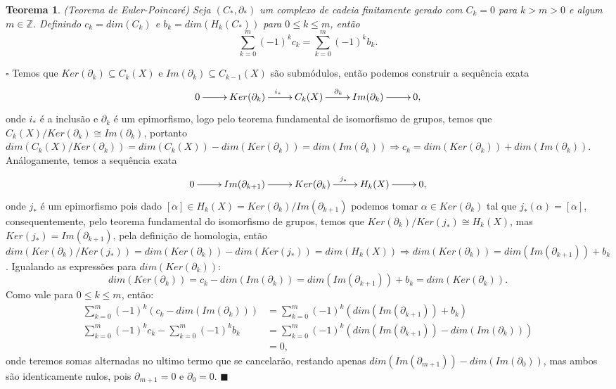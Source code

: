 \documentclass[12pt]{book}
\newtheorem{teorema}{Teorema}[section]
\newenvironment{prova}[1]{$\square$ #1}{\hfill$\blacksquare$}
\newcommand{\classe}[1]{[#1]}
\newcommand{\homologia}[2]{H_{#1}(#2)}
\begin{document}
	\begin{teorema}
		(Teorema de Euler-Poincaré) Seja $(C_{*}, \partial_{*})$ um complexo de cadeia finitamente gerado com $C_{k} = 0$ para $k>m>0$ e algum $m \in \mathbb{Z}$. Definindo $c_{k} = dim(C_{k})$ e $b_{k} = dim(\homologia{k}{C_{*}})$ para $0 \leq k \leq m$, então
		$$
		\sum_{k=0}^{m}(-1)^{k}c_{k} = \sum_{k=0}^{m}(-1)^{k}b_{k}.
		$$
	\end{teorema}
	\begin{prova}
		Temos que $Ker(\partial_{k}) \subseteq C_{k}(X)$ e $Im(\partial_{k}) \subseteq C_{k-1}(X)$ são submódulos, então podemos construir a sequência exata
		$$
		\xymatrix{
			0 \ar[r] & Ker(\partial_{k}) \ar[r]^{i_{*}} &  C_{k}(X)  \ar[r]^{\partial_{k}} & Im(\partial_{k}) \ar[r] & 0,
		}
		$$
		onde $i_{*}$ é a inclusão e $\partial_{k}$ é um epimorfismo, logo pelo teorema fundamental de isomorfismo de grupos, temos que $ C_{k}(X)/Ker(\partial_{k}) \cong Im(\partial_{k})$, portanto $dim(C_{k}(X)/Ker(\partial_{k})) = dim(C_{k}(X)) - dim(Ker(\partial_{k})) = dim(Im(\partial_{k})) \Rightarrow c_{k} = dim(Ker(\partial_{k})) + dim(Im(\partial_{k}))$. Análogamente, temos a sequência exata
		$$
		\xymatrix{
			0 \ar[r] & Im(\partial_{k+1}) \ar[r] &  Ker(\partial_{k})  \ar[r]^{j_{*}} & \homologia{k}{X}\ar[r] & 0,
		}
		$$
		onde $j_{*}$ é um epimorfismo pois dado $\classe{\alpha} \in \homologia{k}{X} = Ker(\partial_{k})/Im(\partial_{k+1})$ podemos tomar $\alpha \in Ker(\partial_{k})$ tal que $j_{*}(\alpha) = \classe{\alpha}$, consequentemente, pelo teorema fundamental do isomorfismo de grupos, temos que $Ker(\partial_{k})/Ker(j_{*}) \cong \homologia{k}{X}$, mas $Ker(j_{*}) = Im(\partial_{k+1})$, pela definição de homologia, então $dim(Ker(\partial_{k})/Ker(j_{*})) = dim(Ker(\partial_{k})) - dim(Ker(j_{*})) = dim(\homologia{k}{X}) \Rightarrow dim(Ker(\partial_{k})) = dim(Im(\partial_{k+1}))+ b_{k}$. Igualando as expressões para $dim(Ker(\partial_{k}))$:
		$$
		dim(Ker(\partial_{k})) = c_{k} - dim(Im(\partial_{k})) = dim(Im(\partial_{k+1}))+ b_{k} = dim(Ker(\partial_{k})).
		$$
		Como vale para $0 \leq k \leq m$, então:
		$$
		\begin{aligned}
		\sum_{k=0}^{m}	(-1)^{k}(c_{k} - dim(Im(\partial_{k}))) &= \sum_{k=0}^{m}	(-1)^{k}( dim(Im(\partial_{k+1}))+ b_{k})
		\\
		\sum_{k=0}^{m}	(-1)^{k}c_{k} - \sum_{k=0}^{m}(-1)^{k} b_{k} &= \sum_{k=0}^{m}	(-1)^{k} (dim(Im(\partial_{k+1})) -  dim(Im(\partial_{k})))
		\\
		&= 0,
		\end{aligned}
		$$
		onde teremos somas alternadas no ultimo termo que se cancelarão, restando apenas $dim(Im(\partial_{m+1})) - dim(Im(\partial_{0}))$, mas ambos são identicamente nulos, pois $\partial_{m+1} = 0$ e $\partial_{0} = 0$.
	\end{prova}
	
\end{document}
